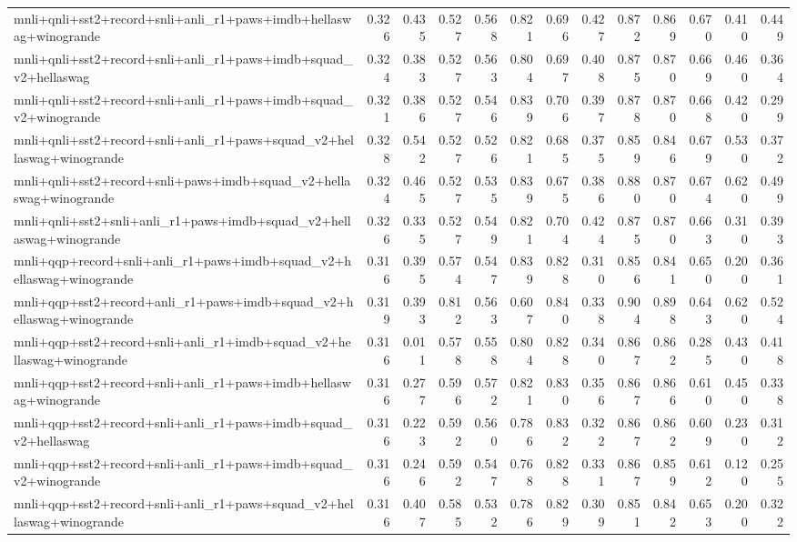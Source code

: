 \begin{table}[t]
\begin{tabular}{lrrrrrrrrrrrr}
    mnli+qnli+sst2+record+snli+anli\_r1+paws+imdb+hellaswag+winogrande & 0.326 & 0.435 & 0.527 & 0.568 & 0.821 & 0.696 & 0.427 & 0.872 & 0.869 & 0.670 & 0.410 & 0.449 \\
    mnli+qnli+sst2+record+snli+anli\_r1+paws+imdb+squad\_v2+hellaswag & 0.324 & 0.383 & 0.527 & 0.563 & 0.804 & 0.697 & 0.408 & 0.875 & 0.870 & 0.669 & 0.460 & 0.364 \\
    mnli+qnli+sst2+record+snli+anli\_r1+paws+imdb+squad\_v2+winogrande & 0.321 & 0.386 & 0.527 & 0.546 & 0.839 & 0.706 & 0.397 & 0.878 & 0.870 & 0.668 & 0.420 & 0.299 \\
    mnli+qnli+sst2+record+snli+anli\_r1+paws+squad\_v2+hellaswag+winogrande & 0.328 & 0.542 & 0.527 & 0.526 & 0.821 & 0.685 & 0.375 & 0.859 & 0.846 & 0.679 & 0.530 & 0.372 \\
    mnli+qnli+sst2+record+snli+paws+imdb+squad\_v2+hellaswag+winogrande & 0.324 & 0.465 & 0.527 & 0.535 & 0.839 & 0.675 & 0.386 & 0.880 & 0.870 & 0.674 & 0.620 & 0.499 \\
    mnli+qnli+sst2+snli+anli\_r1+paws+imdb+squad\_v2+hellaswag+winogrande & 0.326 & 0.335 & 0.527 & 0.549 & 0.821 & 0.704 & 0.424 & 0.875 & 0.870 & 0.663 & 0.310 & 0.393 \\
    mnli+qqp+record+snli+anli\_r1+paws+imdb+squad\_v2+hellaswag+winogrande & 0.316 & 0.395 & 0.574 & 0.547 & 0.839 & 0.828 & 0.310 & 0.856 & 0.841 & 0.650 & 0.200 & 0.361 \\
    mnli+qqp+sst2+record+anli\_r1+paws+imdb+squad\_v2+hellaswag+winogrande & 0.319 & 0.393 & 0.812 & 0.563 & 0.607 & 0.840 & 0.338 & 0.904 & 0.898 & 0.643 & 0.620 & 0.524 \\
    mnli+qqp+sst2+record+snli+anli\_r1+imdb+squad\_v2+hellaswag+winogrande & 0.316 & 0.011 & 0.578 & 0.558 & 0.804 & 0.828 & 0.340 & 0.867 & 0.862 & 0.285 & 0.430 & 0.418 \\
    mnli+qqp+sst2+record+snli+anli\_r1+paws+imdb+hellaswag+winogrande & 0.316 & 0.277 & 0.596 & 0.572 & 0.821 & 0.830 & 0.356 & 0.867 & 0.866 & 0.610 & 0.450 & 0.338 \\
    mnli+qqp+sst2+record+snli+anli\_r1+paws+imdb+squad\_v2+hellaswag & 0.316 & 0.223 & 0.592 & 0.560 & 0.786 & 0.832 & 0.322 & 0.867 & 0.862 & 0.609 & 0.230 & 0.312 \\
    mnli+qqp+sst2+record+snli+anli\_r1+paws+imdb+squad\_v2+winogrande & 0.316 & 0.246 & 0.592 & 0.547 & 0.768 & 0.828 & 0.331 & 0.867 & 0.859 & 0.612 & 0.120 & 0.255 \\
    mnli+qqp+sst2+record+snli+anli\_r1+paws+squad\_v2+hellaswag+winogrande & 0.316 & 0.407 & 0.585 & 0.532 & 0.786 & 0.829 & 0.309 & 0.851 & 0.842 & 0.653 & 0.200 & 0.322 \\

\end{tabular}
\end{table}
